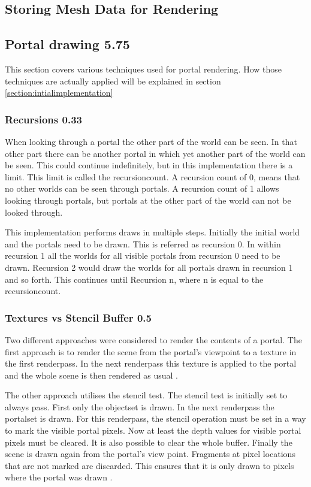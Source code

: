 \subsection{Storing Mesh Data for Rendering}


\subsection{Portal drawing 5.75}
\label{section:portaldrawing}

This section covers various techniques used for portal rendering. How those techniques are actually applied will be explained in section \ref{section:intialimplementation}

\subsubsection{Recursions 0.33}
When looking through a portal the other part of the world can be seen. In that other part there can be another portal in which yet another part of the world can be seen. This could continue indefinitely, but in this implementation there is a limit. This limit is called the \gls{recursioncount}. A recursion count of 0, means that no other worlds can be seen through portals. A recursion count of 1 allows looking through portals, but portals at the other part of the world can not be looked through.

This implementation performs draws in multiple steps. Initially the initial world and the portals need to be drawn. This is referred as recursion 0. In within recursion 1 all the worlds for all visible portals from recursion 0 need to be drawn. Recursion 2 would draw the worlds for all portals drawn in recursion 1 and so forth. This continues until Recursion n, where n is equal to the \gls{recursioncount}.


\subsubsection{Textures vs Stencil Buffer 0.5}
\label{section:textursVsStencil}
Two different approaches were considered to render the contents of a portal. The first approach is to render the scene from the portal's viewpoint to a texture in the first renderpass. In the next renderpass this texture is applied to the portal and the whole scene is then rendered as usual \cite{lecture:portalProblems}.  %

The other approach utilises the stencil test. The stencil test is initially set to always pass. First only the \gls{objectset} is drawn. In the next renderpass the \gls{portalset} is drawn. For this renderpass, the stencil operation must be set in a way to mark the visible portal pixels. Now at least the depth values for visible portal pixels must be cleared. It is also possible to clear the whole buffer. Finally the scene is drawn again from the portal's view point. Fragments at pixel locations that are not marked are discarded. This ensures that it is only drawn to pixels where the portal was drawn \cites{schmalstieg:1999:sewing, lowe:2005:technique, lecture:portalProblems}.


